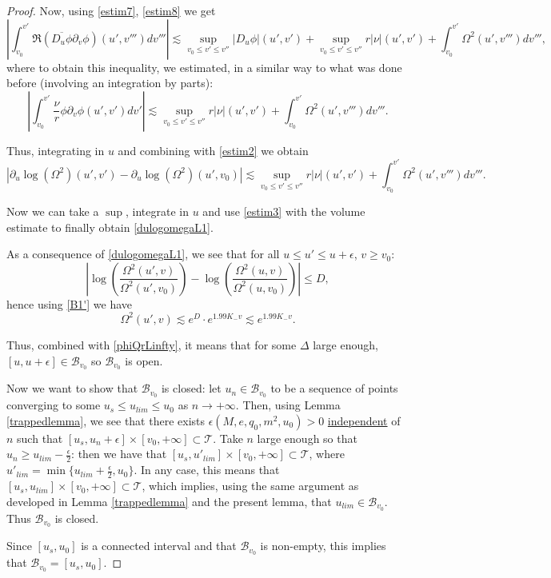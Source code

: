 \documentclass[10pt,a4paper]{article}
\theoremstyle{plain}
\theoremstyle{remark}
\theoremstyle{definition}
\theoremstyle{plain}
\theoremstyle{remark}
\theoremstyle{definition}
\numberwithin{equation}{section}
\begin{document}
\begin{proof}
	Now, using \eqref{estim7}, \eqref{estim8} we get $$ |\int_{v_0}^{v'} \Re(\overline{D_u \phi} \partial_v \phi)(u',v''')dv'''| \lesssim \sup_{ v_0 \leq v' \leq v''}|D_u \phi|(u',v')+ \sup_{ v_0 \leq v' \leq v'' }r|\nu|(u',v')  + \int_{v_0}^{v'} \Omega^2(u',v''')dv''',$$ where to obtain this inequality, \color{black} we estimated, in a similar way to what was done before (involving an integration by parts): $$   | \int_{v_0}^{v'} \frac{\nu}{r} \phi \partial_v \phi(u',v')  dv'| \lesssim  \sup_{ v_0 \leq v' \leq v'' }r|\nu|(u',v')  + \int_{v_0}^{v'} \Omega^2(u',v''')dv''' .$$
	
	Thus, integrating in $u$ and combining with \eqref{estim2} we obtain $$ |\partial_u \log(\Omega^2)(u',v')-\partial_u \log(\Omega^2)(u',v_0)| \lesssim \sup_{ v_0 \leq v' \leq v'' }r|\nu|(u',v')  + \int_{v_0}^{v'} \Omega^2(u',v''')dv'''.$$
	
	Now we can take a $\sup$, integrate in $u$ and use \eqref{estim3} with the volume estimate to finally obtain \eqref{dulogomegaL1}.
	
	
	
	As a consequence of \eqref{dulogomegaL1}, we see that for all $u \leq u' \leq u+\epsilon$, $v \geq v_0$: $$ |\log(\frac{\Omega^2(u',v)}{\Omega^2(u',v_0)})- \log(\frac{\Omega^2(u,v)}{\Omega^2(u,v_0)})| \leq D, $$ hence using \eqref{B1'} we have $$ \Omega^2(u',v) \lesssim e^D \cdot e^{1.99 K_- v} \lesssim  e^{1.99 K_- v}.$$ 
	
	Thus, combined with \eqref{phiQrLinfty}, it means that for some $\Delta$ large enough, $[u,u+\epsilon] \in \mathcal{B}_{v_0}$ so  $\mathcal{B}_{v_0}$ is open.
	
	Now we want to show that $\mathcal{B}_{v_0}$ is closed: let $u_n \in  \mathcal{B}_{v_0}$ to be a sequence of points converging to some $u_s \leq u_{lim} \leq u_0$ as $n \rightarrow+\infty$. Then, using Lemma \ref{trappedlemma}, we see that there exists $\epsilon(M,e,q_0,m^2,u_0)>0$ \underline{independent} of $n$  such that $[u_s,u_n +\epsilon] \times [v_0,+\infty] \subset \mathcal{T}$. Take $n$ large enough so that $u_n \geq u_{lim}-\frac{\epsilon}{2}$: then we have that $[u_s,u'_{lim} ] \times [v_0,+\infty] \subset \mathcal{T}$, where $u'_{lim}= \min \{ u_{lim} +\frac{\epsilon}{2}, u_0\}$. In any case, this means that $[u_s,u_{lim} ] \times [v_0,+\infty] \subset \mathcal{T}$, which implies, using the same argument as developed in Lemma \ref{trappedlemma} and the present lemma, that $u_{lim} \in  \mathcal{B}_{v_0}$. Thus $\mathcal{B}_{v_0}$ is closed.
	
	Since $[u_s,u_0]$ is a connected interval and that $\mathcal{B}_{v_0}$ is non-empty, this implies that $\mathcal{B}_{v_0}=[u_s,u_0]$.
	
\end{proof}
\end{document}
